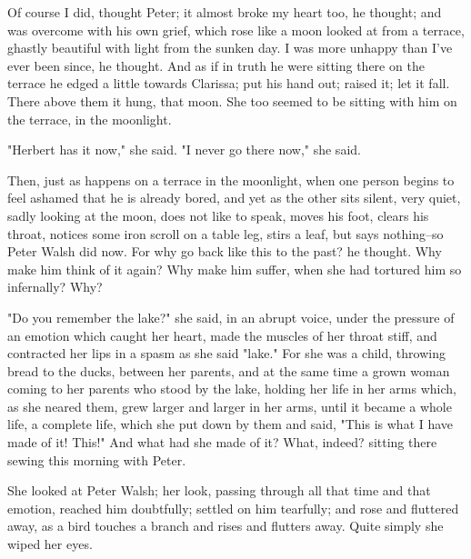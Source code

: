 \documentclass[lang=cn,10pt]{elegantbook}
\begin{document}
Of course I did, thought Peter; it almost broke my heart too, he
thought; and was overcome with his own grief, which rose like a
moon looked at from a terrace, ghastly beautiful with light from
the sunken day.  I was more unhappy than I've ever been since, he
thought.  And as if in truth he were sitting there on the terrace
he edged a little towards Clarissa; put his hand out; raised it;
let it fall.  There above them it hung, that moon.  She too seemed
to be sitting with him on the terrace, in the moonlight.

"Herbert has it now," she said.  "I never go there now," she said.

Then, just as happens on a terrace in the moonlight, when one
person begins to feel ashamed that he is already bored, and yet as
the other sits silent, very quiet, sadly looking at the moon, does
not like to speak, moves his foot, clears his throat, notices some
iron scroll on a table leg, stirs a leaf, but says nothing--so
Peter Walsh did now.  For why go back like this to the past? he
thought.  Why make him think of it again?  Why make him suffer,
when she had tortured him so infernally?  Why?

"Do you remember the lake?" she said, in an abrupt voice, under the
pressure of an emotion which caught her heart, made the muscles of
her throat stiff, and contracted her lips in a spasm as she said
"lake."  For she was a child, throwing bread to the ducks, between
her parents, and at the same time a grown woman coming to her
parents who stood by the lake, holding her life in her arms which,
as she neared them, grew larger and larger in her arms, until it
became a whole life, a complete life, which she put down by them
and said, "This is what I have made of it!  This!"  And what had
she made of it?  What, indeed? sitting there sewing this morning
with Peter.

She looked at Peter Walsh; her look, passing through all that time
and that emotion, reached him doubtfully; settled on him tearfully;
and rose and fluttered away, as a bird touches a branch and rises
and flutters away.  Quite simply she wiped her eyes.
\end{document}
